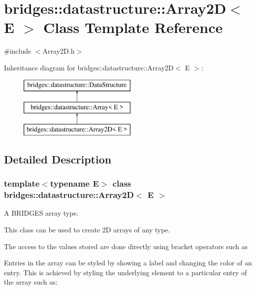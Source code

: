 \hypertarget{classbridges_1_1datastructure_1_1_array2_d}{}\section{bridges\+::datastructure\+::Array2D$<$ E $>$ Class Template Reference}
\label{classbridges_1_1datastructure_1_1_array2_d}


{\ttfamily \#include $<$Array2\+D.\+h$>$}

Inheritance diagram for bridges\+::datastructure\+::Array2D$<$ E $>$\+:\begin{figure}[H]
\begin{center}
\leavevmode
\includegraphics[height=3.000000cm]{classbridges_1_1datastructure_1_1_array2_d}
\end{center}
\end{figure}


\subsection{Detailed Description}
\subsubsection*{template$<$typename E$>$\newline
class bridges\+::datastructure\+::\+Array2\+D$<$ E $>$}

A B\+R\+I\+D\+G\+ES array type. 

This class can be used to create 2D arrays of any type.

The access to the values stored are done directly using bracket operators such as


\begin{DoxyCode}{0}
\end{DoxyCode}


Entries in the array can be styled by showing a label and changing the color of an entry. This is achieved by styling the underlying element to a particular entry of the array such as\+:


